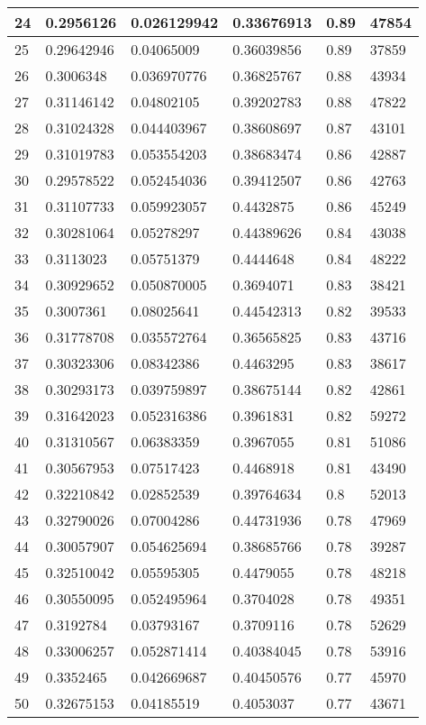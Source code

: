 \begin{longtable}{|l|l|l|l|l|l|}
24 & 0.2956126 & 0.026129942 & 0.33676913 & 0.89 & 47854 \\ \hline 
25 & 0.29642946 & 0.04065009 & 0.36039856 & 0.89 & 37859 \\ \hline 
26 & 0.3006348 & 0.036970776 & 0.36825767 & 0.88 & 43934 \\ \hline 
27 & 0.31146142 & 0.04802105 & 0.39202783 & 0.88 & 47822 \\ \hline 
28 & 0.31024328 & 0.044403967 & 0.38608697 & 0.87 & 43101 \\ \hline 
29 & 0.31019783 & 0.053554203 & 0.38683474 & 0.86 & 42887 \\ \hline 
30 & 0.29578522 & 0.052454036 & 0.39412507 & 0.86 & 42763 \\ \hline 
31 & 0.31107733 & 0.059923057 & 0.4432875 & 0.86 & 45249 \\ \hline 
32 & 0.30281064 & 0.05278297 & 0.44389626 & 0.84 & 43038 \\ \hline 
33 & 0.3113023 & 0.05751379 & 0.4444648 & 0.84 & 48222 \\ \hline 
34 & 0.30929652 & 0.050870005 & 0.3694071 & 0.83 & 38421 \\ \hline 
35 & 0.3007361 & 0.08025641 & 0.44542313 & 0.82 & 39533 \\ \hline 
36 & 0.31778708 & 0.035572764 & 0.36565825 & 0.83 & 43716 \\ \hline 
37 & 0.30323306 & 0.08342386 & 0.4463295 & 0.83 & 38617 \\ \hline 
38 & 0.30293173 & 0.039759897 & 0.38675144 & 0.82 & 42861 \\ \hline 
39 & 0.31642023 & 0.052316386 & 0.3961831 & 0.82 & 59272 \\ \hline 
40 & 0.31310567 & 0.06383359 & 0.3967055 & 0.81 & 51086 \\ \hline 
41 & 0.30567953 & 0.07517423 & 0.4468918 & 0.81 & 43490 \\ \hline 
42 & 0.32210842 & 0.02852539 & 0.39764634 & 0.8 & 52013 \\ \hline 
43 & 0.32790026 & 0.07004286 & 0.44731936 & 0.78 & 47969 \\ \hline 
44 & 0.30057907 & 0.054625694 & 0.38685766 & 0.78 & 39287 \\ \hline 
45 & 0.32510042 & 0.05595305 & 0.4479055 & 0.78 & 48218 \\ \hline 
46 & 0.30550095 & 0.052495964 & 0.3704028 & 0.78 & 49351 \\ \hline 
47 & 0.3192784 & 0.03793167 & 0.3709116 & 0.78 & 52629 \\ \hline 
48 & 0.33006257 & 0.052871414 & 0.40384045 & 0.78 & 53916 \\ \hline 
49 & 0.3352465 & 0.042669687 & 0.40450576 & 0.77 & 45970 \\ \hline 
50 & 0.32675153 & 0.04185519 & 0.4053037 & 0.77 & 43671 \\ \hline 
\end{longtable}